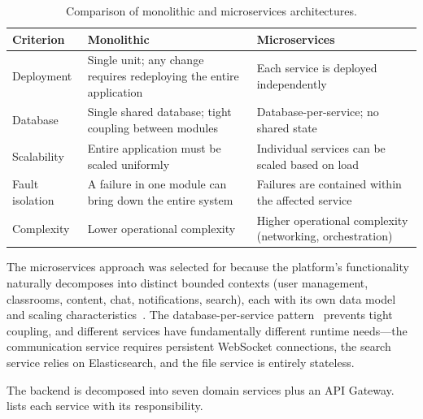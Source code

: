 \begin{table}[H]
  \centering
  \caption{Comparison of monolithic and microservices architectures.}
  \label{tab:mono-vs-micro}
  \small
  \begin{tabularx}{\textwidth}{@{} l X X @{}}
    \toprule
    \textbf{Criterion} & \textbf{Monolithic} & \textbf{Microservices} \\
    \midrule
    Deployment        & Single unit; any change requires redeploying the entire application & Each service is deployed independently \\
    Database          & Single shared database; tight coupling between modules & Database-per-service; no shared state \\
    Scalability       & Entire application must be scaled uniformly & Individual services can be scaled based on load \\
    Fault isolation   & A failure in one module can bring down the entire system & Failures are contained within the affected service \\
    Complexity        & Lower operational complexity & Higher operational complexity (networking, orchestration) \\
    \bottomrule
  \end{tabularx}
\end{table}

The microservices approach was selected for \eduspace{} because the platform's functionality naturally decomposes into distinct bounded contexts (user management, classrooms, content, chat, notifications, search), each with its own data model and scaling characteristics~\cite{newman2021microservices}.
The database-per-service pattern~\cite{richardson2018microservices} prevents tight coupling, and different services have fundamentally different runtime needs---the communication service requires persistent WebSocket connections, the search service relies on Elasticsearch, and the file service is entirely stateless.

The backend is decomposed into seven domain services plus an API Gateway.
 lists each service with its responsibility.

